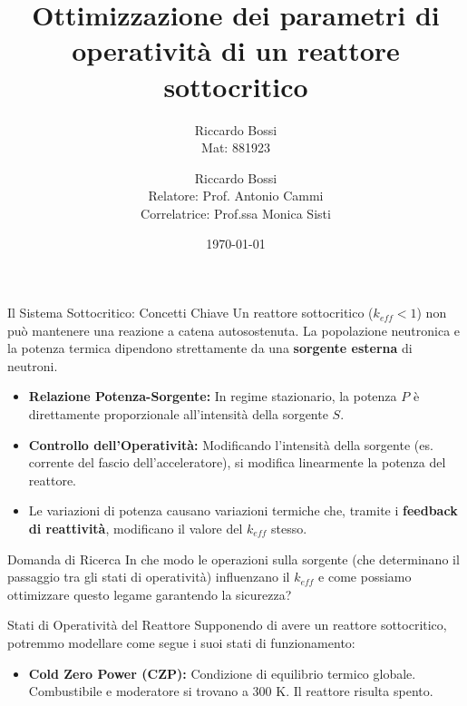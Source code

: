 \documentclass[aspectratio=169]{beamer} %
\title[Ottimizzazione Reattore Sottocritico]{Ottimizzazione dei parametri di operatività di un reattore sottocritico}
\author[R. Bossi]{Riccardo Bossi \\ \small Mat: 881923}
\institute[PoliMi \& Bicocca]{Università degli Studi di Milano-Bicocca \\ Politecnico di Milano}
\author[R. Bossi]{
  Riccardo Bossi \\ \medskip
  {\small Relatore: Prof. Antonio Cammi} \\
  {\small Correlatrice: Prof.ssa Monica Sisti}
}
\date{\today}
\begin{document}
\begin{frame}
  \titlepage
\end{frame}
\begin{frame}{Il Sistema Sottocritico: Concetti Chiave}
    Un reattore sottocritico ($k_{eff} < 1$) non può mantenere una reazione a catena autosostenuta. La popolazione neutronica e la potenza termica dipendono strettamente da una \textbf{sorgente esterna} di neutroni.

    \vspace{0.4cm}
    \begin{itemize}
        \item \textbf{Relazione Potenza-Sorgente:} In regime stazionario, la potenza $P$ è direttamente proporzionale all'intensità della sorgente $S$.
        \item \textbf{Controllo dell'Operatività:} Modificando l'intensità della sorgente (es. corrente del fascio dell'acceleratore), si modifica linearmente la potenza del reattore.
        \item Le variazioni di potenza causano variazioni termiche che, tramite i \textbf{feedback di reattività}, modificano il valore del $k_{eff}$ stesso.
    \end{itemize}

    \vspace{0.3cm}
    \begin{exampleblock}{Domanda di Ricerca}
        In che modo le operazioni sulla sorgente (che determinano il passaggio tra gli stati di operatività) influenzano il $k_{eff}$ e come possiamo ottimizzare questo legame garantendo la sicurezza?
    \end{exampleblock}
\end{frame}

\begin{frame}{Stati di Operatività del Reattore}
    Supponendo di avere un reattore sottocritico, potremmo modellare come segue i suoi stati di funzionamento:
    
    \vspace{0.3cm}
    \begin{itemize}
        \item \textbf{Cold Zero Power (CZP):} Condizione di equilibrio termico globale. Combustibile e moderatore si trovano a $300 \text{ K}$. Il reattore risulta spento.
    \end{itemize}
\end{frame}
\end{document}
